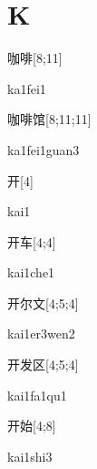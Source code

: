 ﻿%
\section*{K}

\begin{verbete}[ka1fei1]{咖啡}[8;11]
\begin{pronuncia}{ka1fei1}
\end{pronuncia}
\end{verbete}

\begin{verbete}{咖啡馆}[8;11;11]
\begin{pronuncia}{ka1fei1guan3}
\end{pronuncia}
\end{verbete}

\begin{verbete}[kai1]{开}[4]
\begin{pronuncia}{kai1}
\end{pronuncia}
\end{verbete}

\begin{verbete}{开车}[4;4]
\begin{pronuncia}{kai1che1}
\end{pronuncia}
\end{verbete}

\begin{verbete}{开尔文}[4;5;4]
\begin{pronuncia}{kai1er3wen2}
\end{pronuncia}
\end{verbete}

\begin{verbete}[kai1fa1qu1]{开发区}[4;5;4]
\begin{pronuncia}{kai1fa1qu1}
\end{pronuncia}
\end{verbete}

\begin{verbete}{开始}[4;8]
\begin{pronuncia}{kai1shi3}
\end{pronuncia}
\end{verbete}

